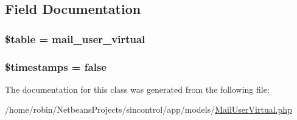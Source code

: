 \subsection{Field Documentation}
\hypertarget{class_mail_user_virtual_ae8876a14058f368335baccf35af4a22b}{}
\subsubsection[{\$table}]{\setlength{\rightskip}{0pt plus 5cm}\$table = \textquotesingle{}mail\+\_\+user\+\_\+virtual\textquotesingle{}\hspace{0.3cm}{\ttfamily [protected]}}\label{class_mail_user_virtual_ae8876a14058f368335baccf35af4a22b}
\hypertarget{class_mail_user_virtual_a51267c24c8fae742ed8f9be0ba6085ee}{}
\subsubsection[{\$timestamps}]{\setlength{\rightskip}{0pt plus 5cm}\$timestamps = false}\label{class_mail_user_virtual_a51267c24c8fae742ed8f9be0ba6085ee}


The documentation for this class was generated from the following file\+:\begin{DoxyCompactItemize}
\item 
/home/robin/\+Netbeans\+Projects/sincontrol/app/models/\hyperlink{_mail_user_virtual_8php}{Mail\+User\+Virtual.\+php}\end{DoxyCompactItemize}
